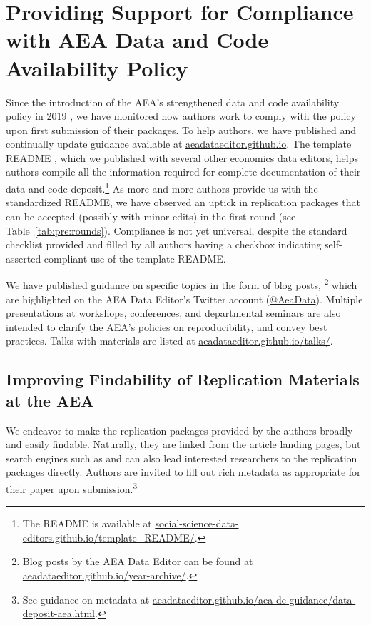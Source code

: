 
\section{Providing Support for Compliance with AEA Data and Code Availability Policy}
\label{sec:dcap}

Since the introduction of the \ac{AEA}'s strengthened data and code availability policy in 2019 \citep{10.1257/pandp.110.dcap}, we have monitored how authors work to comply with the policy upon first submission of their packages. To help authors, we have published and continually update guidance available at  \href{https://aeadataeditor.github.io/}{aeadataeditor.github.io}. The  template README \citep{READMEv1.1.0}, which we published with several other economics data editors,  helps authors compile all the information required for complete documentation of their data and code deposit.\footnote{The README is available at \href{https://social-science-data-editors.github.io/template_README/}{social-science-data-editors.github.io/template\_README/}.} As more and more authors provide us with the standardized README, we have observed an uptick in replication packages that can be accepted (possibly with minor edits) in the first round (see Table~\ref{tab:pre:rounds}). Compliance is not yet universal, despite the standard checklist provided and filled by all authors having a checkbox indicating self-asserted compliant use of the template README. 

We have published guidance on specific topics in the form of blog posts,%
\footnote{Blog posts by the AEA Data Editor can be found at \href{https://aeadataeditor.github.io/year-archive/}{aeadataeditor.github.io/year-archive/}.}
%
which are highlighted on the AEA Data Editor's Twitter account (\href{https://twitter.com/AEAData}{@AeaData}). Multiple presentations at workshops, conferences, and departmental seminars are also intended to clarify the AEA's policies on reproducibility, and convey best practices. Talks with materials are listed at \href{https://aeadataeditor.github.io/talks/}{aeadataeditor.github.io/talks/}.

\subsection{Improving Findability of Replication Materials at the AEA}
\label{sec:findability}

We endeavor to make the replication packages provided by the authors broadly and easily findable. Naturally, they are linked from the article landing pages, but search engines  such as  and  can also lead interested researchers to the replication packages directly. Authors are invited to fill out rich metadata as appropriate for their paper upon submission.\footnote{See guidance on metadata at \href{https://aeadataeditor.github.io/aea-de-guidance/data-deposit-aea.html}{aeadataeditor.github.io/aea-de-guidance/data-deposit-aea.html}.} 

